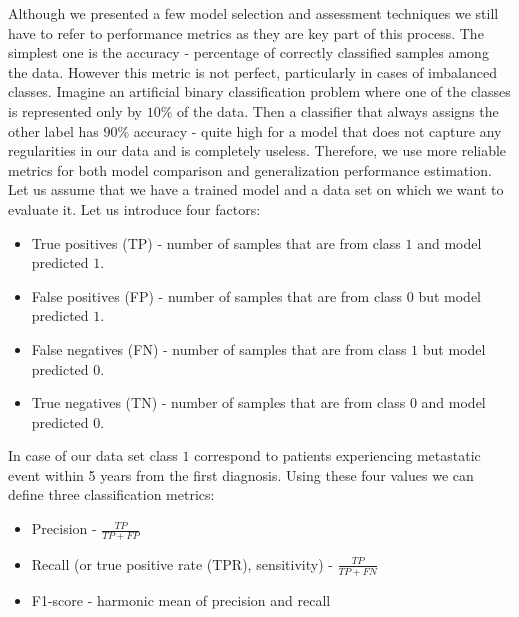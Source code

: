 \documentclass[shortabstract, english, mgr]{iithesis}
\begin{document}
Although we presented a few model selection and assessment techniques we still have to refer to performance metrics as they are key part of this process. The simplest one is the accuracy - percentage of correctly classified samples among the data. However this metric is not perfect, particularly in cases of imbalanced classes. Imagine an artificial binary classification problem where one of the classes is represented only by $10\%$ of the data. Then a classifier that always assigns the other label has $90\%$ accuracy - quite high for a model that does not capture any regularities in our data and is completely useless. Therefore, we use more reliable metrics for both model comparison and generalization performance estimation. Let us assume that we have a trained model and a data set on which we want to evaluate it. Let us introduce four factors:
\begin{itemize}
    \item True positives (TP) - number of samples that are from class $1$ and model predicted $1$.
    \item False positives (FP) - number of samples that are from class $0$ but model predicted $1$.
    \item False negatives (FN) - number of samples that are from class $1$ but model predicted $0$.
    \item True negatives (TN) - number of samples that are from class $0$ and model predicted $0$. 
\end{itemize}
In case of our data set class $1$ correspond to patients experiencing metastatic event within 5 years from the first diagnosis. Using these four values we can define three classification metrics:
\begin{itemize}
    \item Precision - $\frac{TP}{TP + FP}$
    \item Recall (or true positive rate (TPR), sensitivity) - $\frac{TP}{TP + FN}$
    \item F1-score - harmonic mean of precision and recall
\end{itemize}
\end{document}
